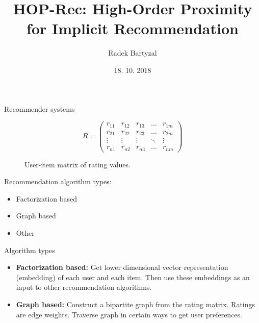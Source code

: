 \documentclass{beamer}
\begin{document}
\title{HOP-Rec: High-Order Proximity for Implicit Recommendation}  
\author{Radek Bartyzal}
\date{18. 10. 2018} 

\frame{\titlepage} 

\begin{frame}{Recommender systems}

\begin{figure}[h!]
\centering
\[
R = 
\begin{pmatrix}
    r_{11} & r_{12} & r_{13} & \dots  & r_{1m} \\
    r_{21} & r_{22} & r_{23} & \dots  & r_{2m} \\
    \vdots & \vdots & \vdots & \ddots & \vdots \\
    r_{n1} & r_{n2} & r_{n3} & \dots  & r_{nm}
\end{pmatrix}
\]
\caption{User-item matrix of rating values.}
\label{fig:rating-matrix}
\end{figure}

Recommendation algorithm types:
\begin{itemize}
\item Factorization based
\item Graph based
\item Other
\end{itemize}

\end{frame}

\begin{frame}{Algorithm types}

\begin{itemize}
\item \textbf{Factorization based:} Get lower dimensional vector representation (embedding) of each user and each item. Then use these embeddings as an input to other recommendation algorithms.\vfill

\item \textbf{Graph based:} Construct a bipartite graph from the rating matrix. Ratings are edge weights. Traverse graph in certain ways to get user preferences.
\end{itemize}

\end{frame}
\end{document}
